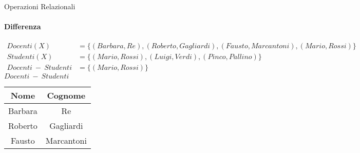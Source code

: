     \begin{frame}{Operazioni Relazionali}
        \framesubtitle{Differenza}
        \vspace{-1cm}
        \begin{align*}Docenti(X) &= \{(Barbara,Re),(Roberto,Gagliardi),(Fausto,Marcantoni),(Mario,Rossi)\}\\
        Studenti(X) &= \{(Mario,Rossi),(Luigi,Verdi),(Pinco,Pallino)\}\\
        Docenti~-~Studenti &= \{(Mario,Rossi)\}
        \end{align*}
        \centering
        $Docenti~-~Studenti$\\
        \begin{tabular}{|c|c|}
            \hline
            \rowcolor{cyan!30}Nome & Cognome \\
            \hline
            Barbara & Re \\ \hline
            Roberto & Gagliardi \\ \hline
            Fausto & Marcantoni \\ \hline
        \end{tabular}
    \end{frame}
